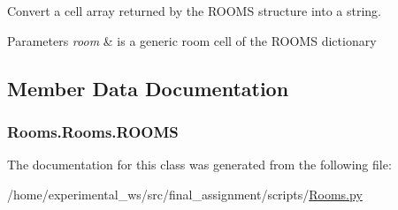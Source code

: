 Convert a cell array returned by the R\+O\+O\+MS structure into a string. 


\begin{DoxyParams}{Parameters}
{\em room} & is a generic room cell of the R\+O\+O\+MS dictionary \\
\hline
\end{DoxyParams}


\subsection{Member Data Documentation}
\subsubsection[{\texorpdfstring{R\+O\+O\+MS}{ROOMS}}]{\setlength{\rightskip}{0pt plus 5cm}Rooms.\+Rooms.\+R\+O\+O\+MS\hspace{0.3cm}{\ttfamily [static]}}\hypertarget{classRooms_1_1Rooms_a45a955141e4dd142491b43124c07ab95}{}\label{classRooms_1_1Rooms_a45a955141e4dd142491b43124c07ab95}


The documentation for this class was generated from the following file\+:\begin{DoxyCompactItemize}
\item 
/home/experimental\+\_\+ws/src/final\+\_\+assignment/scripts/\hyperlink{Rooms_8py}{Rooms.\+py}\end{DoxyCompactItemize}

